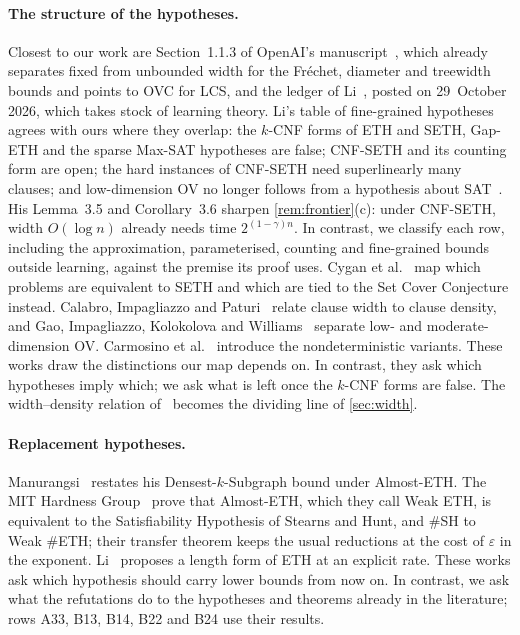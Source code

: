 \documentclass[10pt]{amsart}
\theoremstyle{plain}
\theoremstyle{definition}
\theoremstyle{remark}
\numberwithin{equation}{section}
\begin{document}
\paragraph{The structure of the hypotheses.} Closest to our work are Section~1.1.3 of OpenAI's
manuscript~\cite{OpenAI26}, which already separates fixed from unbounded width for the Fr\'echet,
diameter and treewidth bounds and points to OVC for LCS, and the ledger of Li~\cite[\S6]{Li26},
posted on 29~October 2026, which takes stock of learning theory. Li's table of fine-grained
hypotheses agrees with ours where they overlap: the $k$-CNF forms of ETH and SETH, Gap-ETH and the
sparse Max-SAT hypotheses are false; CNF-SETH and its counting form are open; the hard instances of
CNF-SETH need superlinearly many clauses; and low-dimension OV no longer follows from a hypothesis
about SAT~\cite[Table~1, Prop.~6.1]{Li26}. His Lemma~3.5 and Corollary~3.6 sharpen
\cref{rem:frontier}(c): under CNF-SETH, width $O(\log n)$ already needs time $2^{(1-\gamma)n}$. In
contrast, we classify each row, including the approximation, parameterised, counting and
fine-grained bounds outside learning, against the premise its proof uses. Cygan et
al.~\cite{CDLMNOPSW16} map which problems are equivalent to SETH and which are tied to the Set Cover Conjecture
instead. Calabro, Impagliazzo and Paturi~\cite{CIP06} relate clause width to clause density, and
Gao, Impagliazzo, Kolokolova and Williams~\cite{GIKW17} separate low- and moderate-dimension OV.
Carmosino et al.~\cite{CGIMPS16} introduce the nondeterministic variants. These works draw the
distinctions our map depends on. In contrast, they ask which hypotheses imply which; we ask what is
left once the $k$-CNF forms are false. The width--density relation of~\cite{CIP06} becomes the
dividing line of \cref{sec:width}.

\paragraph{Replacement hypotheses.} Manurangsi~\cite{Man26} restates his Densest-$k$-Subgraph
bound under Almost-ETH. The MIT Hardness Group~\cite{MIT26} prove that Almost-ETH, which they call
Weak ETH, is equivalent to the Satisfiability Hypothesis of Stearns and Hunt, and $\#$SH to Weak
$\#$ETH; their transfer theorem keeps the usual reductions at the cost of $\varepsilon$ in the
exponent. Li~\cite[Hyp.~2.14]{Li26} proposes a length form of ETH at an explicit rate. These works
ask which hypothesis should carry lower bounds from now on. In contrast, we ask what the
refutations do to the hypotheses and theorems already in the literature; rows A33, B13, B14, B22
and B24 use their results.
\end{document}
